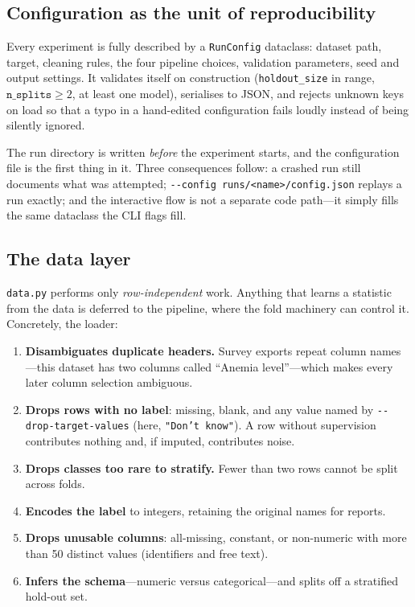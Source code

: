 \documentclass[11pt,a4paper]{article}
\begin{document}
\subsection{Configuration as the unit of reproducibility}

Every experiment is fully described by a \texttt{RunConfig} dataclass: dataset
path, target, cleaning rules, the four pipeline choices, validation parameters,
seed and output settings. It validates itself on construction
(\texttt{holdout\_size} in range, $\texttt{n\_splits} \ge 2$, at least one
model), serialises to JSON, and rejects unknown keys on load so that a typo in
a hand-edited configuration fails loudly instead of being silently ignored.

The run directory is written \emph{before} the experiment starts, and the
configuration file is the first thing in it. Three consequences follow: a
crashed run still documents what was attempted; \texttt{-{}-config
runs/<name>/config.json} replays a run exactly; and the interactive flow is not
a separate code path---it simply fills the same dataclass the CLI flags fill.

\subsection{The data layer}

\texttt{data.py} performs only \emph{row-independent} work. Anything that
learns a statistic from the data is deferred to the pipeline, where the fold
machinery can control it. Concretely, the loader:

\begin{enumerate}[leftmargin=1.6em,itemsep=0.25em]
  \item \textbf{Disambiguates duplicate headers.} Survey exports repeat column names---this dataset has two columns called ``Anemia level''---which makes every later column selection ambiguous.
  \item \textbf{Drops rows with no label}: missing, blank, and any value named by \texttt{-{}-drop-target-values} (here, \texttt{"Don't know"}). A row without supervision contributes nothing and, if imputed, contributes noise.
  \item \textbf{Drops classes too rare to stratify.} Fewer than two rows cannot be split across folds.
  \item \textbf{Encodes the label} to integers, retaining the original names for reports.
  \item \textbf{Drops unusable columns}: all-missing, constant, or non-numeric with more than 50 distinct values (identifiers and free text).
  \item \textbf{Infers the schema}---numeric versus categorical---and splits off a stratified hold-out set.
\end{enumerate}
\end{document}
